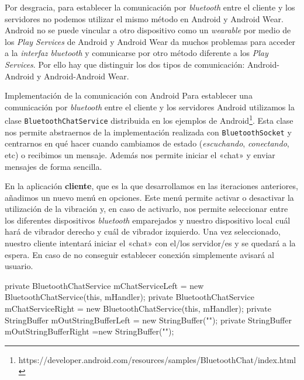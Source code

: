 Por desgracia, para establecer la comunicación por \emph{bluetooth} entre el cliente y los
servidores no podemos utilizar el mismo método en Android y Android Wear. Android no se puede
vincular a otro dispositivo como un \emph{wearable} por medio de los \emph{Play Services} de Android
y Android Wear da muchos problemas para acceder a la \emph{interfaz bluetooth} y comunicarse por
otro método diferente a los \emph{Play Services}. Por ello hay que distinguir los dos tipos de
comunicación: Android-Android y Android-Android Wear.

\newpage
\begin{definitionlist}
  \item[Implementación de la comunicación con Android] Para establecer una comunicación por
    \emph{bluetooth} entre el cliente y los servidores Android utilizamos la clase
    \texttt{BluetoothChatService} distribuida en los ejemplos de
    Android\footnote{https://developer.android.com/resources/samples/BluetoothChat/index.html}. Esta
    clase nos permite abstraernos de la implementación realizada con \texttt{BluetoothSocket} y
    centrarnos en qué hacer cuando cambiamos de estado (\emph{escuchando}, \emph{conectando}, etc) o
    recibimos un mensaje. Además nos permite iniciar el «chat» y enviar mensajes de forma sencilla.

    En la aplicación \textbf{cliente}, que es la que desarrollamos en las iteraciones anteriores,
    añadimos un nuevo menú en opciones. Este menú permite activar o desactivar la utilización de la
    vibración y, en caso de activarlo, nos permite seleccionar entre los diferentes dispositivos
    \emph{bluetooth} emparejados y nuestro dispositivo local cuál hará de vibrador derecho y cuál de
    vibrador izquierdo. Una vez seleccionado, nuestro cliente intentará iniciar el «chat» con el/los
    servidor/es y se quedará a la espera. En caso de no conseguir establecer conexión simplemente
    avisará al usuario.

\begin{listing}[
  language = java,
  caption  = {Métodos utilizados para enviar mensajes por bluetooth haciendo uso de la clase
               \texttt{BluetoothChatServide}},
  label    = code:sendMessage]
private BluetoothChatService mChatServiceLeft = 
  new BluetoothChatService(this, mHandler);
private BluetoothChatService mChatServiceRight =
  new BluetoothChatService(this, mHandler);
private StringBuffer mOutStringBufferLeft = new StringBuffer("");
private StringBuffer mOutStringBufferRight =new StringBuffer("");


\end{listing}
\end{definitionlist}
